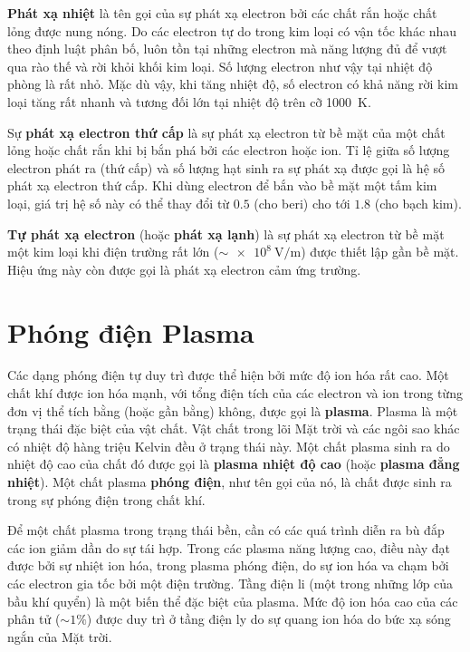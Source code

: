 \textbf{Phát xạ nhiệt} là tên gọi của sự phát xạ electron bởi các chất rắn hoặc chất lỏng được nung nóng.
Do các electron tự do trong kim loại có vận tốc khác nhau theo định luật phân bố, luôn tồn tại những electron mà năng lượng đủ để vượt qua rào thế và rời khỏi khối kim loại.
Số lượng electron như vậy tại nhiệt độ phòng là rất nhỏ.
Mặc dù vậy, khi tăng nhiệt độ, số electron có khả năng rời kim loại tăng rất nhanh và tương đối lớn tại nhiệt độ trên cỡ \SI{1000}{\kelvin}.

Sự \textbf{phát xạ electron thứ cấp} là sự phát xạ electron từ bề mặt của một chất lỏng hoặc chất rắn khi bị bắn phá bởi các electron hoặc ion.
Tỉ lệ giữa số lượng electron phát ra (thứ cấp) và số lượng hạt sinh ra sự phát xạ được gọi là hệ số phát xạ electron thứ cấp.
Khi dùng electron để bắn vào bề mặt một tấm kim loại, giá trị hệ số này có thể thay đổi từ $0.5$ (cho beri) cho tới $1.8$ (cho bạch kim).

\textbf{Tự phát xạ electron} (hoặc \textbf{phát xạ lạnh}) là sự phát xạ electron từ bề mặt một kim loại khi điện trường rất lớn ($\sim\SI{e8}{\volt\per\metre}$) được thiết lập gần bề mặt.
Hiệu ứng này còn được gọi là phát xạ electron cảm ứng trường.

\section{Phóng điện Plasma}\label{sec:12_5}

Các dạng phóng điện tự duy trì được thể hiện bởi mức độ ion hóa rất cao.
Một chất khí được ion hóa mạnh, với tổng điện tích của các electron và ion trong từng đơn vị thể tích 
bằng (hoặc gần bằng) không, được gọi là \textbf{plasma}.
Plasma là một trạng thái đặc biệt của vật chất.
Vật chất trong lõi Mặt trời và các ngôi sao khác có nhiệt độ hàng triệu Kelvin đều ở trạng thái này.
Một chất plasma sinh ra do nhiệt độ cao của chất đó được gọi là \textbf{plasma nhiệt độ cao} (hoặc \textbf{plasma đẳng nhiệt}).
Một chất plasma \textbf{phóng điện}, như tên gọi của nó, là chất được sinh ra trong sự phóng điện trong chất khí.

Để một chất plasma trong trạng thái bền, cần có các quá trình diễn ra bù đắp các ion giảm dần do sự tái hợp.
Trong các plasma năng lượng cao, điều này đạt được bởi sự nhiệt ion hóa, trong plasma phóng điện, do sự ion hóa va chạm bởi các electron gia tốc bởi một điện trường.
Tầng điện li (một trong những lớp của bầu khí quyển) là một biến thể đặc biệt của plasma.
Mức độ ion hóa cao của các phân tử ($\sim 1\%$) được duy trì ở tầng điện ly do sự quang ion hóa do bức xạ sóng ngắn của Mặt trời.

